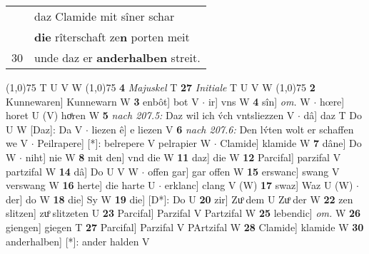 \documentclass[8pt,a4paper,notitlepage]{article}
\begin{document}
\begin{table}[ht]
\begin{minipage}[t]{0.5\linewidth}
\begin{tabular}{rl}
 & daz Clamide mit sîner schar\\ 
 & \textbf{die} rîterschaft ze\textbf{n} porten meit\\ 
30 & unde daz er \textbf{anderhalben} streit.\\ 
\end{tabular}
\scriptsize
\line(1,0){75} \newline
T U V W \newline
\line(1,0){75} \newline
\textbf{4} \textit{Majuskel} T  \textbf{27} \textit{Initiale} T U V W  \newline
\line(1,0){75} \newline
\textbf{2} Kunnewaren] Kunnewarn W \textbf{3} enbôt] bot V  $\cdot$ ir] vns W \textbf{4} sîn] \textit{om.} W  $\cdot$ hœre] horet U (V) hoͤren W \textbf{5} \textit{nach 207.5:} Daz wil ich v́ch vntsliezzen V   $\cdot$ dâ] daz T Do U W [Daz]: Da V  $\cdot$ liezen ê] e liezen V \textbf{6} \textit{nach 207.6:} Den lv́ten wolt er schaffen we V   $\cdot$ Peilrapere] [*]: belrepere V pelrapier W  $\cdot$ Clamide] klamide W \textbf{7} dâne] Do W  $\cdot$ niht] nie W \textbf{8} mit den] vnd die W \textbf{11} daz] die W \textbf{12} Parcifal] parzifal V partzifal W \textbf{14} dâ] Do U V W  $\cdot$ offen gar] gar offen W \textbf{15} erswanc] swang V verswang W \textbf{16} herte] die harte U  $\cdot$ erklanc] clang V (W) \textbf{17} swaz] Waz U (W)  $\cdot$ der] do W \textbf{18} die] Sy W \textbf{19} die] [D*]: Do U \textbf{20} zir] Zuͦ dem U Zuͦ der W \textbf{22} zen slitzen] zuͦ slitzeten U \textbf{23} Parcifal] Parzifal V Partzifal W \textbf{25} lebendic] \textit{om.} W \textbf{26} giengen] giegen T \textbf{27} Parcifal] Parzifal V PArtzifal W \textbf{28} Clamide] klamide W \textbf{30} anderhalben] [*]: ander halden V \newline
\end{minipage}
\end{table}
\end{document}

